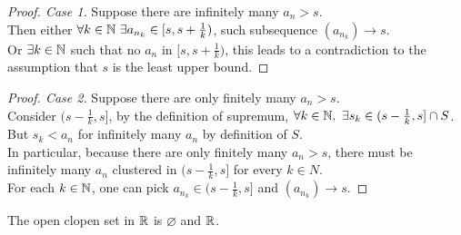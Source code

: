 \documentclass[11pt]{article}
\begin{document}
 	\begin{proof}[Proof. Case 1]
 		Suppose there are infinitely many $a_n > s$. \\
 		Then either $\forall k \in \mathbb{N}\ \exists a_{n_k} \in [s, s + \frac{1}{k})$, such subsequence $(a_{n_k}) \to s$. \\
 		Or $\exists k \in \mathbb{N}$ such that no $a_n$ in $[s, s + \frac{1}{k})$, this leads to a contradiction to the assumption that $s$ is the least upper bound.
 	\end{proof}
 	
 	\begin{proof}[Proof. Case 2]
 		Suppose there are only finitely many $a_n > s$. \\
 		Consider $(s - \frac{1}{k}, s]$, by the definition of supremum, $\forall k \in \mathbb{N},\ \exists s_k \in (s - \frac{1}{k}, s] \cap S$. \\
 		But $s_k < a_n$ for infinitely many $a_n$ by definition of $S$. \\
 		In particular, because there are only finitely many $a_n > s$, there must be infinitely many $a_n$ clustered in $(s - \frac{1}{k}, s]$ for every $k \in N$.\\
 		For each $k \in \mathbb{N}$, one can pick $a_{n_k} \in (s - \frac{1}{k}, s]$ and $(a_{n_k}) \to s$.
 	\end{proof}
 	
 	\begin{proposition}
 		The open clopen set in $\mathbb{R}$ is $\varnothing$ and $\mathbb{R}$.
 	\end{proposition}
 	
\end{document}
